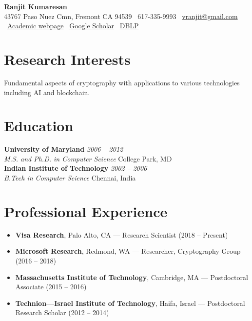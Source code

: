 \documentclass[11pt]{article}
\newcommand{\entry}[4]{
    \noindent\textbf{#1} \hfill \textit{#2} \\
    \noindent\textit{#3} \hfill #4 \\
}
\begin{document}
\begin{center}
    \LARGE\textbf{Ranjit Kumaresan} \\
    \vspace{1mm}
    \normalsize
    43767 Paso Nuez Cmn, Fremont CA 94539 \quad
    \faPhone\ 617-335-9993 \quad 
    \faEnvelope\ \href{mailto:vranjit@gmail.com}{vranjit@gmail.com} \\
    \faGlobe\ \href{http://people.csail.mit.edu/ranjit/}{Academic webpage} \quad
    \faGoogle\ \href{https://scholar.google.com/citations?user=YC3Ab4oAAAAJ&hl=en}{Google Scholar} \quad
    \faDatabase\ \href{https://dblp.org/pid/14/4245.html}{DBLP}
\end{center}

\vspace{-3mm}

\section{Research Interests}
Fundamental aspects of cryptography with applications to various technologies including AI and blockchain.

\section{Education}
\entry{University of Maryland}{2006 – 2012}{M.S. and Ph.D. in Computer Science}{College Park, MD}
\entry{Indian Institute of Technology}{2002 – 2006}{B.Tech in Computer Science}{Chennai, India}

\vspace{-5mm}

\section{Professional Experience}
\begin{itemize}[leftmargin=*, noitemsep, topsep=0pt]
    \item \textbf{Visa Research}, Palo Alto, CA — Research Scientist (2018 – Present)
    \item \textbf{Microsoft Research}, Redmond, WA — Researcher, Cryptography Group (2016 – 2018)
    \item \textbf{Massachusetts Institute of Technology}, Cambridge, MA — Postdoctoral Associate (2015 – 2016)
    \item \textbf{Technion—Israel Institute of Technology}, Haifa, Israel — Postdoctoral Research Scholar (2012 – 2014)
\end{itemize}
\end{document}
